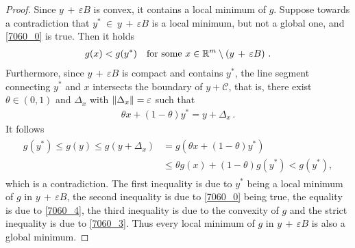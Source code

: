 \begin{proof}
  Since 
  $
  y
  \,
  +
  \,
  \varepsilon
  B
  $
  is convex, it contains a 
  local minimum  
  of $g$.
  Suppose towards a contradiction that
  $
    y^* 
    \ 
    \in 
    \ 
  y
  \,
  +
  \,
  \varepsilon
  B
  $
  is a local minimum, but not a global one, and
  \eqref{7060_0} is true.
  Then it holds
  \begin{gather}
    \label{7060_3}
    g(x) < g(y^*)
    \quad
    \text{for some}\ 
    x 
    \in 
    \R^m 
    \setminus 
    \left( 
  y
  \,
  +
  \,
  \varepsilon
  B
    \right)
  \,.
  \end{gather}
  Furthermore, since 
  $
  y
  \,
  +
  \,
  \varepsilon
  B
  $ is compact and contains $y^*$,
  the line segment connecting 
  $y^*$ and $x$
  intersects the boundary of 
  $y + \mathcal{C}$, that is,
  there exist
  $
    \theta \in (0,1)
  $
  and 
  $
    \Delta_x
  $
  with 
  $
    \left\lVert\Delta_x\right\rVert=\varepsilon
  $
  such that
  \begin{gather}
    \label{7060_4}
    \theta x + (1 - \theta) y^* = y + \Delta_x
    \,.
  \end{gather}
    It follows
    \begin{align}
      \label{7060_5}
      \begin{split}
      g(y^*)
      \le
      g(y)
      \le
      g(y + \Delta_x)
      &=
      g(
        \theta x + (1 - \theta) y^*
      )
      \\
      &\le
      \theta g(x)
      + 
      (1 - \theta)
      g(y^*)
      <
      g(y^*)
      ,
      \end{split}
    \end{align}
    which is a contradiction.
    The first inequality is due to
    $y^*$ being a local minimum of $g$ in
    $
  y
  \,
  +
  \,
  \varepsilon
  B
    $,
    the second inequality is due to  
    \eqref{7060_0} being true,
    the equality is due to \eqref{7060_4},
    the third inequality is due to the convexity of $g$
    and the strict inequality is due to \eqref{7060_3}.
    Thus every local minimum of $g$ in
    $
  y
  \,
  +
  \,
  \varepsilon
  B
    $
    is also a global minimum.
\end{proof}
